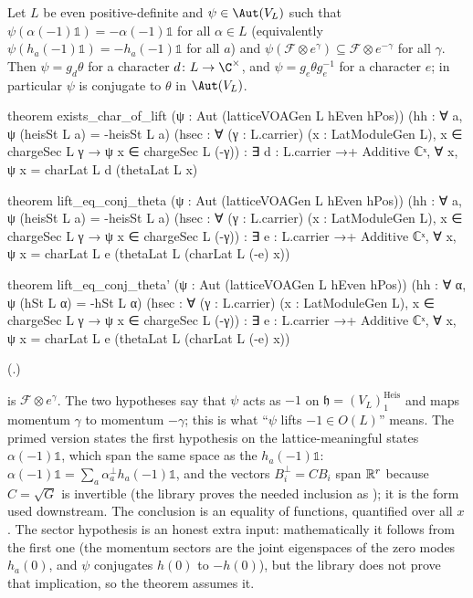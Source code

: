 \begin{theorem}[Rigidity]\label{ch03:thm:rigidity}
Let $L$ be even positive-definite and $\psi\in\Aut(V_L)$ such that $\psi(\alpha(-1)\mathbb 1)=
-\alpha(-1)\mathbb 1$ for all $\alpha\in L$ (equivalently $\psi(h_a(-1)\mathbb 1)=-h_a(-1)\mathbb1$
for all $a$) and $\psi(\mathcal F\otimes e^\gamma)\subseteq\mathcal F\otimes e^{-\gamma}$ for all
$\gamma$. Then $\psi=g_d\theta$ for a character $d\colon L\to\C^\times$, and $\psi=g_e\theta
g_e^{-1}$ for a character $e$; in particular $\psi$ is conjugate to $\theta$ in $\Aut(V_L)$.
\end{theorem}
\begin{leancode}
theorem exists_char_of_lift (ψ : Aut (latticeVOAGen L hEven hPos))
    (hh : ∀ a, ψ (heisSt L a) = -heisSt L a)
    (hsec : ∀ (γ : L.carrier) (x : LatModuleGen L), x ∈ chargeSec L γ → ψ x ∈ chargeSec L (-γ)) :
    ∃ d : L.carrier →+ Additive ℂˣ, ∀ x, ψ x = charLat L d (thetaLat L x)

theorem lift_eq_conj_theta (ψ : Aut (latticeVOAGen L hEven hPos))
    (hh : ∀ a, ψ (heisSt L a) = -heisSt L a)
    (hsec : ∀ (γ : L.carrier) (x : LatModuleGen L), x ∈ chargeSec L γ → ψ x ∈ chargeSec L (-γ)) :
    ∃ e : L.carrier →+ Additive ℂˣ, ∀ x, ψ x = charLat L e (thetaLat L (charLat L (-e) x))

theorem lift_eq_conj_theta' (ψ : Aut (latticeVOAGen L hEven hPos))
    (hh : ∀ α, ψ (hSt L α) = -hSt L α)
    (hsec : ∀ (γ : L.carrier) (x : LatModuleGen L), x ∈ chargeSec L γ → ψ x ∈ chargeSec L (-γ)) :
    ∃ e : L.carrier →+ Additive ℂˣ, ∀ x, ψ x = charLat L e (thetaLat L (charLat L (-e) x))
\end{leancode}
(.)

\begin{dictionary}
 is $\mathcal F\otimes e^\gamma$. The two hypotheses say that $\psi$ acts as
$-1$ on $\mathfrak h=(V_L)_1^{\text{Heis}}$ and maps momentum $\gamma$ to momentum $-\gamma$; this is
what ``$\psi$ lifts $-1\in O(L)$'' means. The primed version states the first hypothesis on the
lattice-meaningful states $\alpha(-1)\mathbb 1$, which span the same space as the $h_a(-1)\mathbb1$:
$\alpha(-1)\mathbb1=\sum_a\alpha^\perp_ah_a(-1)\mathbb1$, and the vectors $B_i^\perp=CB_i$ span
$\mathbb{R}^r$ because $C=\sqrt G$ is invertible (the library proves the needed inclusion as
); it is the form used downstream.
The conclusion is an equality of functions, quantified over all $x$. The sector hypothesis is an honest extra input: mathematically it follows from the first one
(the momentum sectors are the joint eigenspaces of the zero modes $h_a(0)$, and $\psi$ conjugates
$h(0)$ to $-h(0)$), but the library does not prove that implication, so the theorem assumes it.
\end{dictionary}

